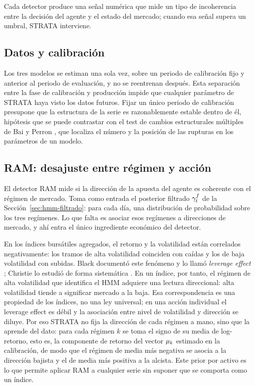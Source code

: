 Cada detector produce una señal numérica que mide un tipo de incoherencia entre la decisión del agente y el estado del mercado; cuando esa señal supera un umbral, STRATA interviene.

\subsection{Datos y calibración}
\label{sec:strata-calib}

Los tres modelos se estiman una sola vez, sobre un periodo de calibración fijo y anterior al periodo de evaluación, y no se reentrenan después. Esta separación entre la fase de calibración y producción impide que cualquier parámetro de STRATA haya visto los datos futuros. Fijar un único periodo de calibración presupone que la estructura de la serie es razonablemente estable dentro de él, hipótesis que se puede contrastar con el test de cambios estructurales múltiples de Bai y Perron \cite{bai1998, bai2003}, que localiza el número y la posición de las rupturas en los parámetros de un modelo. 

\subsection{RAM: desajuste entre régimen y acción}
\label{sec:strata-ram}

El detector RAM mide si la dirección de la apuesta del agente es coherente con el régimen de mercado. Toma como entrada el posterior filtrado $\gamma^{f}_t$ de la Sección~\ref{sec:hmm-filtrado}: para cada día, una distribución de probabilidad sobre los tres regímenes. Lo que falta es asociar esos regímenes a direcciones de mercado, y ahí entra el único ingrediente económico del detector.

En los índices bursátiles agregados, el retorno y la volatilidad están correlados negativamente: los tramos de alta volatilidad coinciden con caídas y los de baja volatilidad con subidas. Black documentó este fenómeno y lo llamó \emph{leverage effect} \cite{black1976}; Christie lo estudió de forma sistemática \cite{christie1982}. En un índice, por tanto, el régimen de alta volatilidad que identifica el HMM adquiere una lectura direccional: alta volatilidad tiende a significar mercado a la baja. Esa correspondencia es una propiedad de los índices, no una ley universal; en una acción individual el leverage effect es débil y la asociación entre nivel de volatilidad y dirección se diluye. Por eso STRATA no fija la dirección de cada régimen a mano, sino que la aprende del dato: para cada régimen $k$ se toma el signo de su media de log-retorno, esto es, la componente de retorno del vector $\mu_k$ estimado en la calibración, de modo que el régimen de media más negativa se asocia a la dirección bajista y el de media más positiva a la alcista. Este prior por activo es lo que permite aplicar RAM a cualquier serie sin suponer que se comporta como un índice.

